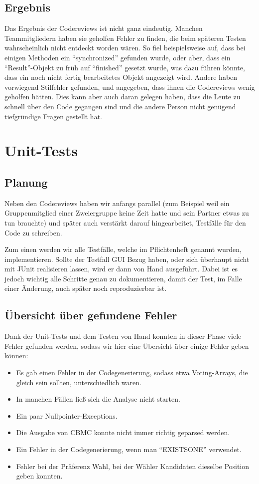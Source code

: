 \documentclass[a4paper]{scrreprt}
\begin{document}
\section{Ergebnis}
Das Ergebnis der Codereviews ist nicht ganz eindeutig. Manchen
Teammitgliedern haben sie geholfen Fehler zu finden, die beim späteren Testen
wahrscheinlich nicht entdeckt worden wären. So fiel beispielsweise auf, dass
bei einigen Methoden ein "`synchronized"' gefunden wurde, oder aber, dass ein
"`Result"'-Objekt zu früh auf "`finished"' gesetzt wurde, was dazu führen
könnte, dass ein noch nicht fertig bearbeitetes Objekt angezeigt wird.
Andere haben vorwiegend Stilfehler gefunden, und angegeben, dass
ihnen die Codereviews wenig geholfen hätten. Dies kann aber auch
daran gelegen haben, dass die Leute zu schnell über den Code gegangen sind und
die andere Person nicht genügend tiefgründige Fragen gestellt hat.

\chapter{Unit-Tests}

\section{Planung}
Neben den Codereviews haben wir anfangs parallel (zum
Beispiel weil ein Gruppenmitglied einer Zweiergruppe keine Zeit hatte und sein
Partner etwas zu tun brauchte) und später auch
verstärkt darauf hingearbeitet, Testfälle für den Code zu schreiben.

Zum einen werden wir alle Testfälle, welche im Pflichtenheft genannt wurden,
implementieren. Sollte der Testfall GUI Bezug haben, oder sich überhaupt nicht mit JUnit
realisieren lassen, wird er dann von Hand ausgeführt. Dabei ist es jedoch wichtig alle Schritte genau zu
dokumentieren, damit der Test, im Falle einer Änderung, auch später noch
reproduzierbar ist.

\section{Übersicht über gefundene Fehler}
Dank der Unit-Tests und dem Testen von Hand konnten in dieser Phase viele
Fehler gefunden werden, sodass wir hier eine Übersicht über einige Fehler geben können:

\begin{itemize}
  \item Es gab einen Fehler in der Codegenerierung, sodass etwa Voting-Arrays, die gleich sein sollten, unterschiedlich waren.
  \item In manchen Fällen ließ sich die Analyse nicht starten.
  \item Ein paar Nullpointer-Exceptions.
  \item Die Ausgabe von CBMC konnte nicht immer richtig geparsed werden.
  \item Ein Fehler in der Codegenerierung, wenn man "`EXISTSONE"' verwendet.
  \item Fehler bei der Präferenz Wahl, bei der Wähler Kandidaten dieselbe
  Position geben konnten.
\end{itemize}
\end{document}
